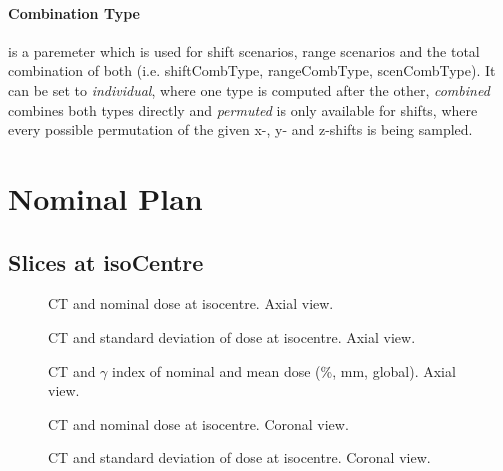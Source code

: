 \documentclass[a4paper]{scrartcl}
\begin{document}
\paragraph{Combination Type} is a paremeter which is used for shift scenarios, range scenarios and the total combination of both (i.e. shiftCombType, rangeCombType, scenCombType).
It can be set to \textit{individual}, where one type is computed after the other, \textit{combined} combines both types directly and \textit{permuted} is only available for shifts, where every possible permutation of the given x-, y- and z-shifts is being sampled.






\FloatBarrier
\newpage

\section{Nominal Plan}
\subsection{Slices at isoCentre}
\begin{figure}[!b]
  \centering
  
  \caption{CT and nominal dose at isocentre. Axial view.}
\end{figure}

\begin{figure}[!b]
  \centering
  
  \caption{CT and standard deviation of dose at isocentre. Axial view.}
\end{figure}

\begin{figure}[!b]
  \centering
  
  \caption{CT and $\gamma$ index of nominal and mean dose (\gammaDoseAgreement \%, \gammaDoseAgreement mm, global). Axial view.}
\end{figure}

\begin{figure}[!b]
  \centering
  
  \caption{CT and nominal dose at isocentre. Coronal view.}
\end{figure}

\begin{figure}[!b]
  \centering
  
  \caption{CT and standard deviation of dose at isocentre. Coronal view.}
\end{figure}
\end{document}
